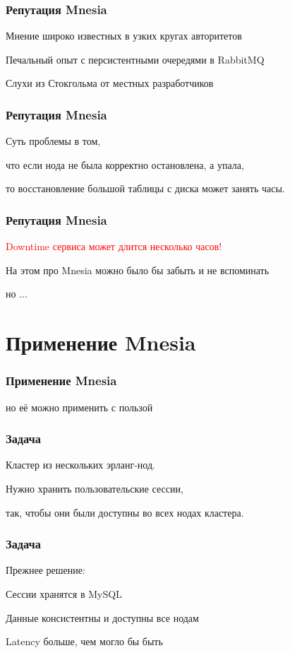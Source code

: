 \documentclass[10pt]{beamer}
\begin{document}
\begin{frame}
\frametitle{Репутация Mnesia}
\centering
Мнение широко известных в узких кругах авторитетов
\par
\bigskip
Печальный опыт с персистентными очередями в RabbitMQ
\par
\bigskip
Слухи из Стокгольма от местных разработчиков
\end{frame}

\begin{frame}
\frametitle{Репутация Mnesia}
\centering
Суть проблемы в том,
\par \bigskip
что если нода не была корректно остановлена, а упала,
\par \bigskip
то восстановление большой таблицы с диска может занять часы.
\end{frame}

\begin{frame}
\frametitle{Репутация Mnesia}
\centering
\textcolor{red}{Downtime сервиса может длится несколько часов!}
\par \bigskip
На этом про Mnesia можно было бы забыть и не вспоминать
\par \bigskip
но ...
\end{frame}

\section{Применение Mnesia}

\begin{frame}
\frametitle{Применение Mnesia}
\centering
но её можно применить с пользой
\end{frame}

\begin{frame}
\frametitle{Задача}
\centering
Кластер из нескольких эрланг-нод.
\par \bigskip
Нужно хранить пользовательские сессии,
\par \bigskip
так, чтобы они были доступны во всех нодах кластера.
\end{frame}

\begin{frame}
\frametitle{Задача}
\centering
Прежнее решение:
\par \bigskip
Сессии хранятся в MySQL
\par \bigskip
Данные консистентны и доступны все нодам
\par \bigskip
Latency больше, чем могло бы быть
\end{frame}
\end{document}
